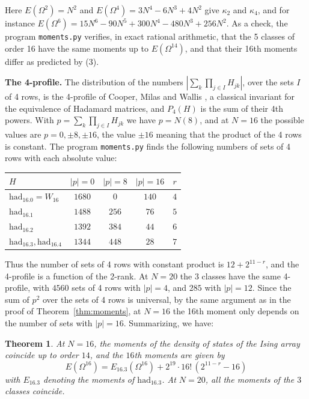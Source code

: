 \documentclass[11pt,a4paper]{article}
\newtheorem{thm}{Theorem}[section]
\theoremstyle{remark}
\begin{document}
Here $E(\Omega^2)=N^2$ and $E(\Omega^4)=3N^4-6N^3+4N^2$ give $\kappa_2$ and $\kappa_4$, and for instance $E(\Omega^6)=15N^6-90N^5+300N^4-480N^3+256N^2$. As a check, the program \texttt{moments.py} verifies, in exact rational arithmetic, that the 5 classes of order 16 have the same moments up to $E(\Omega^{14})$, and that their 16th moments differ as predicted by (3).

\medskip

\noindent\textbf{The 4-profile.}
The distribution of the numbers $|\sum_k\prod_{j\in I}H_{jk}|$, over the sets $I$ of 4 rows, is the 4-profile of Cooper, Milas and Wallis \cite{cmw}, a classical invariant for the equivalence of Hadamard matrices, and $P_4(H)$ is the sum of their 4th powers. With $p=\sum_k\prod_{j\in I}H_{jk}$ we have $p=N(8)$, and at $N=16$ the possible values are $p=0,\pm8,\pm16$, the value $\pm16$ meaning that the product of the 4 rows is constant. The program \texttt{moments.py} finds the following numbers of sets of 4 rows with each absolute value:

\medskip

\begin{center}
\begin{tabular}{|l|c|c|c|c|}
\hline
$H$ & $|p|=0$ & $|p|=8$ & $|p|=16$ & $r$\\
\hline
$\mathrm{had}_{16.0}=W_{16}$ & $1680$ & $0$ & $140$ & $4$\\
$\mathrm{had}_{16.1}$ & $1488$ & $256$ & $76$ & $5$\\
$\mathrm{had}_{16.2}$ & $1392$ & $384$ & $44$ & $6$\\
$\mathrm{had}_{16.3},\mathrm{had}_{16.4}$ & $1344$ & $448$ & $28$ & $7$\\
\hline
\end{tabular}
\end{center}

\medskip

Thus the number of sets of 4 rows with constant product is $12+2^{11-r}$, and the 4-profile is a function of the 2-rank. At $N=20$ the 3 classes have the same 4-profile, with $4560$ sets of 4 rows with $|p|=4$, and $285$ with $|p|=12$. Since the sum of $p^2$ over the sets of 4 rows is universal, by the same argument as in the proof of Theorem~\ref{thm:moments}, at $N=16$ the 16th moment only depends on the number of sets with $|p|=16$. Summarizing, we have:

\begin{samepage}
\begin{thm}\label{thm:profile}
At $N=16$, the moments of the density of states of the Ising array coincide up to order $14$, and the $16$th moments are given by
\[
 E(\Omega^{16})=E_{16.3}(\Omega^{16})+2^{19}\cdot16!\,(2^{11-r}-16)
\]
with $E_{16.3}$ denoting the moments of $\mathrm{had}_{16.3}$. At $N=20$, all the moments of the $3$ classes coincide.
\end{thm}
\end{samepage}
\end{document}

